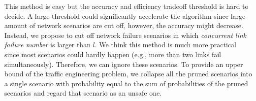 \documentclass[sigconf]{acmart}
\begin{document}
\iffalse
This method is easy but the accuracy and efficiency tradeoff threshold is hard to decide.
A large threshold could significantly accelerate the algorithm since large amount of network scenarios are cut off, however, the accuracy might decrease.
Instead, we propose to cut off network failure scenarios in which \textit{concurrent link failure number} is larger than $l$.
We think this method is much more practical since most scenarios could hardly happen (e.g., more than two links fail simultaneously). 
Therefore, we can ignore these scenarios.
To provide an upper bound of the traffic engineering problem, we collapse all the pruned scenarios into a single scenario with probability equal to the sum of probabilities of the pruned scenarios and regard that scenario as an unsafe one.
\end{document}
